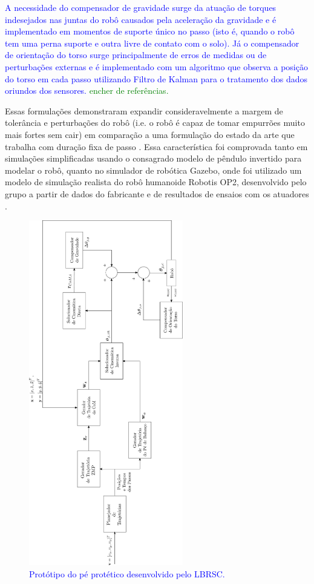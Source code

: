 \textcolor{blue}{A necessidade do compensador de gravidade surge da atuação de torques indesejados nas juntas do robô causados pela aceleração da gravidade e é implementado em momentos de suporte único no passo (isto é, quando o robô tem uma perna suporte e outra livre de contato com o solo). Já o compensador de orientação do torso surge principalmente de erros de medidas ou de perturbações externas e é implementado com um algoritmo que observa a posição do torso em cada passo utilizando Filtro de Kalman para o tratamento dos dados oriundos dos sensores.} \textcolor{green}{encher de referências.}

Essas formulações demonstraram expandir consideravelmente a margem de tolerância e perturbações do robô (i.e. o robô é capaz de tomar empurrões muito mais fortes sem cair) em comparação a uma formulação do estado da arte que trabalha com duração fixa de passo \cite{max30}. Essa característica foi comprovada tanto em simulações simplificadas usando o consagrado modelo de pêndulo invertido \cite{kajita2001} para modelar o robô, quanto no simulador de robótica Gazebo, onde foi utilizado um modelo de simulação realista do robô humanoide Robotis OP2, desenvolvido pelo grupo a partir de dados do fabricante e de resultados de ensaios com os atuadores \cite{max27}. 
 
\begin{figure} 
	\centering
	\includegraphics[width=0.6\textwidth]{walking_engine_overview.png}
	\caption{\textcolor{blue}{Protótipo do pé protético desenvolvido pelo LBRSC.}}
	\label{FIG: doc manga}
\end{figure} 
 
